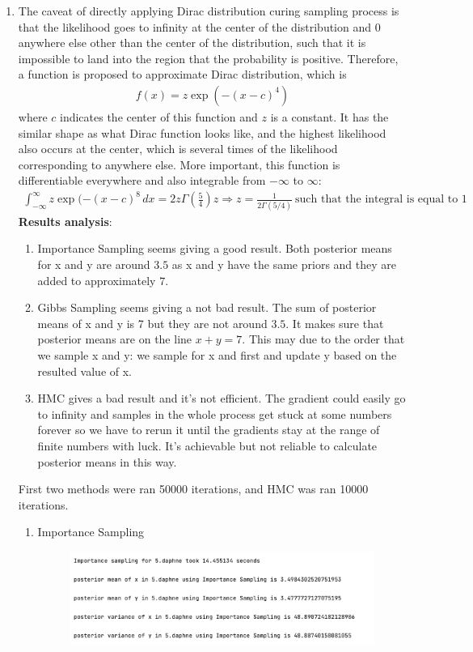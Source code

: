 \documentclass{article}
\begin{document}
\begin{enumerate}
\begin{enumerate}
\end{enumerate}
\newpage
\item The caveat of directly applying Dirac distribution curing sampling process is that the likelihood goes to infinity at the center of the distribution and 0 anywhere else other than the center of the distribution,  such that it is impossible to land into the region that the probability is positive. Therefore,  a function is proposed to approximate Dirac distribution,  which is 
\begin{align*}
f(x) = z\exp(-(x-c)^4)
\end{align*}
where $c$ indicates the center of this function and $z$ is a constant.  It has the similar shape as what Dirac function looks like,  and the highest likelihood also occurs at the center, which is several times of the likelihood corresponding to anywhere else.  More important, this function is differentiable everywhere and also integrable from $-\infty$ to $\infty$:
\begin{align*}
\int_{-\infty}^\infty z\exp(-(x - c)^8\,dx = 2z\Gamma\left(\frac 54\right)z\Rightarrow z = \frac{1}{2\Gamma(5/4)}\ \text{such that the integral is equal to 1}
\end{align*} 
\textbf{Results analysis}: 
\begin{enumerate}
\item Importance Sampling seems giving a good result.  Both posterior means for x and y are around $3.5$ as x and y have the same priors and they are added to approximately $7$.
\item Gibbs Sampling seems giving a not bad result.  The sum of posterior means of x and y is 7 but they are not around $3.5$.  It makes sure that posterior means are on the line $x + y = 7$. This may due to the order that we sample x and y: we sample for x and first and update y based on the resulted value of x.
\item  HMC gives a bad result and it's not efficient.  The gradient could easily go to infinity and samples in the whole process get stuck at some numbers forever so we have to rerun it until the gradients stay at the range of finite numbers with luck.  It's achievable but not reliable to calculate posterior means in this way. 
\end{enumerate}
First two methods were ran 50000 iterations, and HMC was ran 10000 iterations.\\
\hfill
\begin{enumerate}
\item Importance Sampling
\begin{figure}[!ht]
	\centering
	\includegraphics[scale=0.5]{../figs/IS/5_program_results}
\end{figure}


\end{enumerate}
\end{enumerate}
\end{document}

